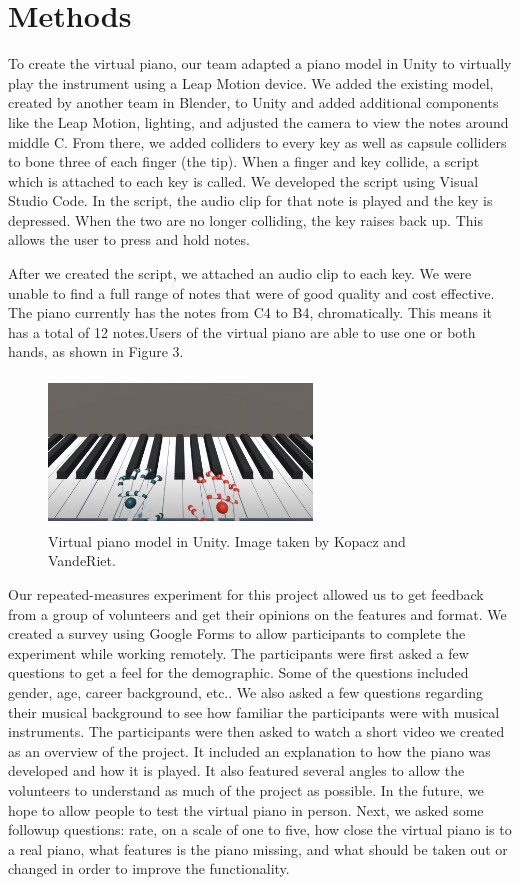 \documentclass[conference,compsoc]{IEEEtran}
\begin{document}
\section{Methods}
To create the virtual piano, our team adapted a piano model in Unity to virtually play the instrument using a Leap Motion device. We added the existing model, created by another team in Blender, to Unity and added additional components like the Leap Motion, lighting, and adjusted the camera to view the notes around middle C. From there, we added colliders to every key as well as capsule colliders to bone three of each finger (the tip). When a finger and key collide, a script which is attached to each key is called. We developed the script using Visual Studio Code. In the script, the audio clip for that note is played and the key is depressed. When the two are no longer colliding, the key raises back up. This allows the user to press and hold notes.

After we created the script, we attached an audio clip to each key. We were unable to find a full range of notes that were of good quality and cost effective. The piano currently has the notes from C4 to B4, chromatically. This means it has a total of 12 notes.Users of the virtual piano are able to use one or both hands, as shown in Figure 3. 

\begin{figure}[h]
\centering
\includegraphics[width=7cm, height=4cm]{IEEEtran/UnityHands.JPG}
\centering
\caption{Virtual piano model in Unity. Image taken by Kopacz and VandeRiet.}
\end{figure}

Our repeated-measures experiment for this project allowed us to get feedback from a group of volunteers and get their opinions on the features and format. We created a survey using Google Forms to allow participants to complete the experiment while working remotely. The participants were first asked a few questions to get a feel for the demographic. Some of the questions included gender, age, career background, etc.. We also asked a few questions regarding their musical background to see how familiar the participants were with musical instruments. The participants were then asked to watch a short video we created as an overview of the project. It included an explanation to how the piano was developed and how it is played. It also featured several angles to allow the volunteers to understand as much of the project as possible. In the future, we hope to allow people to test the virtual piano in person. Next, we asked some followup questions: rate, on a scale of one to five, how close the virtual piano is to a real piano, what features is the piano missing, and what should be taken out or changed in order to improve the functionality. 
\end{document}
